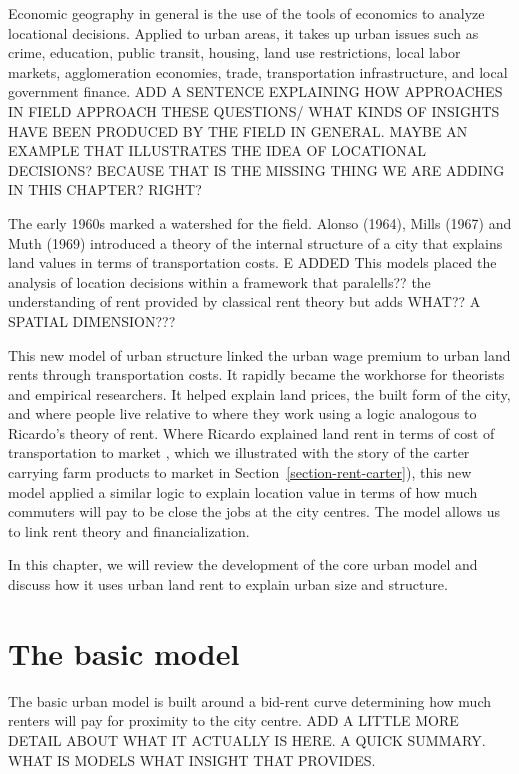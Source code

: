 Economic geography in general is the use of the tools of economics to analyze locational decisions. Applied to urban areas, it takes up urban issues such as crime, education, public transit, housing, land use restrictions, local labor markets, agglomeration economies, trade, transportation infrastructure, and local government finance. ADD A SENTENCE EXPLAINING HOW APPROACHES IN FIELD APPROACH THESE  QUESTIONS/ WHAT KINDS OF INSIGHTS HAVE BEEN PRODUCED BY THE FIELD IN GENERAL. MAYBE AN EXAMPLE THAT ILLUSTRATES THE IDEA OF  LOCATIONAL DECISIONS? BECAUSE THAT IS THE MISSING THING WE ARE ADDING IN THIS CHAPTER? RIGHT?

The early 1960s marked a watershed for the field.  Alonso (1964), Mills (1967) and Muth (1969) introduced a theory of the internal structure of a city that explains land values in terms of transportation costs. E ADDED This models placed the analysis of location decisions within a framework that paralells?? the understanding of rent provided by classical rent theory but adds WHAT?? A SPATIAL DIMENSION??? 


This new model of urban structure linked the \gls{urban wage premium} to urban land rents through transportation costs.  It rapidly became the workhorse for theorists and empirical researchers. It helped explain land prices, the built form of the city, and where people live relative to where they work using a logic analogous to Ricardo's theory of rent. Where Ricardo explained land rent in terms of cost of transportation to market , which we illustrated with the story of the carter carrying farm products to market in Section~\ref{section-rent-carter}), this new model applied a similar logic to explain location value in terms of how much commuters will pay to be close the jobs at the city centres. The model allows us to link rent theory and financialization. %

In this chapter, we will review the development of the core urban model and discuss how it uses urban land rent to explain urban size and structure. %

\section{The basic model}
The basic urban model is built around a \gls{bid-rent curve} determining how much renters will pay for proximity to the city centre. 
ADD A LITTLE MORE DETAIL ABOUT WHAT IT ACTUALLY IS HERE. A QUICK SUMMARY. WHAT IS MODELS WHAT INSIGHT THAT PROVIDES. 

